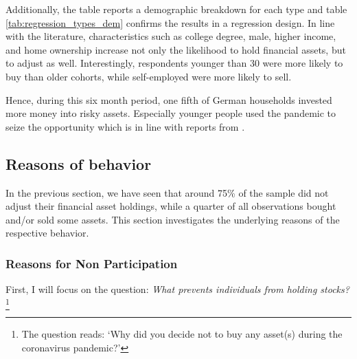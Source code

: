 \documentclass[ProjectABM]{subfiles}
\begin{document}

Additionally, the table reports a demographic breakdown for each type and table \ref{tab:regression_types_dem} confirms the results in a regression design. In line with the literature, characteristics such as college degree, male, higher income, and home ownership increase not only the likelihood to hold financial assets, but to adjust as well. Interestingly, respondents younger than 30 were more likely to buy than older cohorts, while self-employed were more likely to sell.

Hence, during this six month period, one fifth of German households invested more money into risky assets. Especially younger people used the pandemic to seize the opportunity which is in line with reports from \cite{DAI_2021}. %






\subsection{Reasons of behavior}
In the previous section, we have seen that around 75\% of the sample did not adjust their financial asset holdings, while a quarter of all observations bought and/or sold some assets. This section investigates the underlying reasons of the respective behavior.

\subsubsection{Reasons for Non Participation}\label{sec:reason_nopart}
First, I will focus on the question: \textit{What prevents individuals from holding stocks?}\footnote{The question reads: `Why did you decide not to buy any asset(s) during the coronavirus pandemic?'} 
\end{document}
